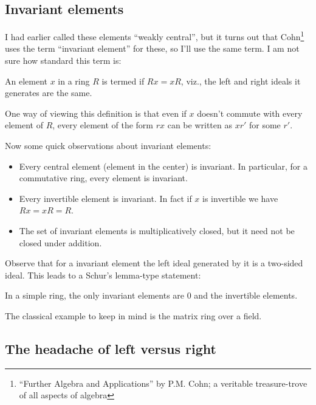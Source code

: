 \documentclass[a4paper]{amsart}
\begin{document}
\subsection{Invariant elements}

I had earlier called these elements ``weakly central'', but it turns
out that Cohn\footnote{``Further Algebra and Applications'' by
  P.M. Cohn; a veritable treasure-trove of all aspects of algebra}
uses the term ``invariant element'' for these, so I'll use the same
term. I am not sure how standard this term is:

\begin{definer}
  An element $x$ in a ring $R$ is termed
   if $Rx = xR$, viz., the
  left and right ideals it generates are the same.
\end{definer}

One way of viewing this definition is that even if $x$ doesn't commute
with every element of $R$, every element of the form $rx$ can be
written as $xr'$ for some $r'$.

Now some quick observations about invariant elements:

\begin{itemize}

\item Every central element (element in the center) is invariant. In
  particular, for a commutative ring, every element is invariant.

\item Every invertible element is invariant. In fact if $x$ is
  invertible we have $Rx = xR = R$.

\item The set of invariant elements is multiplicatively closed,
  but it need not be closed under addition.

\end{itemize}

Observe that for a invariant element the left ideal generated by
it is a two-sided ideal. This leads to a Schur's lemma-type statement:

\begin{claimer}
  In a simple ring, the only invariant elements are $0$ and the
  invertible elements.
\end{claimer}

The classical example to keep in mind is the matrix ring over a field.

\subsection{The headache of left versus right}
\end{document}
